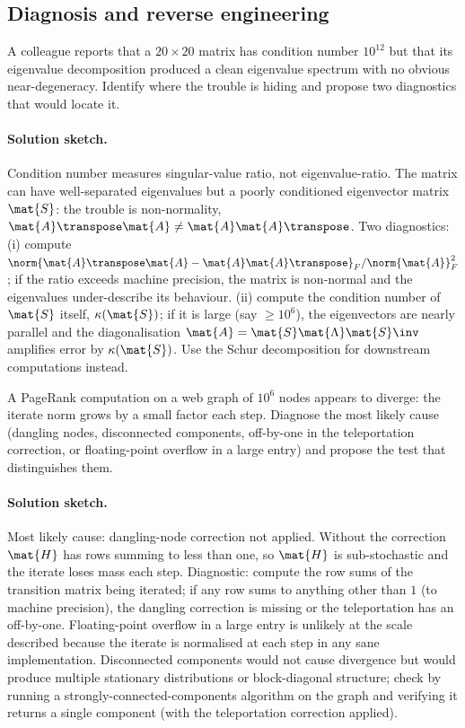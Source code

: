 \subsection*{Diagnosis and reverse engineering}

\begin{exercise}
A colleague reports that a $20 \times 20$ matrix has condition
number $10^{12}$ but that its eigenvalue decomposition produced a
clean eigenvalue spectrum with no obvious near-degeneracy. Identify
where the trouble is hiding and propose two diagnostics that would
locate it.
\end{exercise}

\paragraph{Solution sketch.}
Condition number measures singular-value ratio, not
eigenvalue-ratio. The matrix can have well-separated eigenvalues
but a poorly conditioned eigenvector matrix $\mat{S}$: the trouble
is non-normality, $\mat{A}\transpose \mat{A} \neq \mat{A}\mat{A}
\transpose$. Two diagnostics: (i) compute $\norm{\mat{A}\transpose
\mat{A} - \mat{A} \mat{A}\transpose}_{F}/\norm{\mat{A}}_{F}^{2}$;
if the ratio exceeds machine precision, the matrix is non-normal
and the eigenvalues under-describe its behaviour. (ii) compute the
condition number of $\mat{S}$ itself,
$\kappa(\mat{S})$; if it is large (say $\geq 10^{6}$), the
eigenvectors are nearly parallel and the diagonalisation
$\mat{A} = \mat{S} \mat{\Lambda} \mat{S}\inv$ amplifies error by
$\kappa(\mat{S})$. Use the Schur decomposition for downstream
computations instead.

\begin{exercise}
A PageRank computation on a web graph of $10^{6}$ nodes appears to
diverge: the iterate norm grows by a small factor each step.
Diagnose the most likely cause (dangling nodes, disconnected
components, off-by-one in the teleportation correction, or
floating-point overflow in a large entry) and propose the test
that distinguishes them.
\end{exercise}

\paragraph{Solution sketch.}
Most likely cause: dangling-node correction not applied. Without
the correction $\mat{H}$ has rows summing to less than one, so
$\mat{H}$ is sub-stochastic and the iterate loses mass each step.
Diagnostic: compute the row sums of the transition matrix being
iterated; if any row sums to anything other than $1$ (to machine
precision), the dangling correction is missing or the
teleportation has an off-by-one. Floating-point overflow in a large
entry is unlikely at the scale described because the iterate is
normalised at each step in any sane implementation. Disconnected
components would not cause divergence but would produce multiple
stationary distributions or block-diagonal structure; check by
running a strongly-connected-components algorithm on the graph and
verifying it returns a single component (with the teleportation
correction applied).

